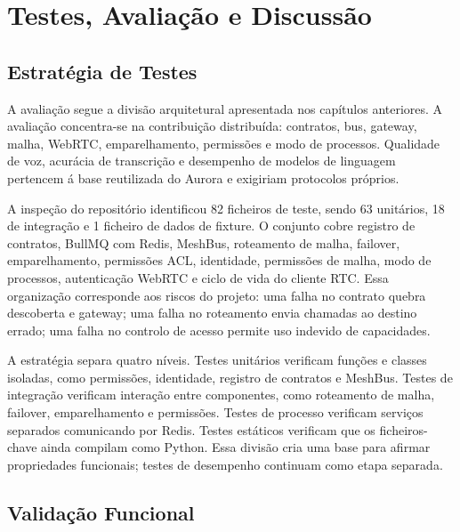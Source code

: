 \chapter{Testes, Avalia\c{c}\~{a}o e Discuss\~{a}o}
\label{chap:testes-avaliacao}

\section{Estrat\'{e}gia de Testes}
\label{sec:estrategia-testes}

A avalia\c{c}\~{a}o segue a divis\~{a}o arquitetural apresentada nos cap\'{i}tulos anteriores. A avalia\c{c}\~{a}o concentra-se na contribui\c{c}\~{a}o distribu\'{i}da: contratos, bus, gateway, malha, WebRTC, emparelhamento, permiss\~{o}es e modo de processos. Qualidade de voz, acur\'{a}cia de transcri\c{c}\~{a}o e desempenho de modelos de linguagem pertencem \'{a} base reutilizada do Aurora e exigiriam protocolos pr\'{o}prios.

A inspe\c{c}\~{a}o do reposit\'{o}rio identificou 82 ficheiros de teste, sendo 63 unit\'{a}rios, 18 de integra\c{c}\~{a}o e 1 ficheiro de dados de fixture. O conjunto cobre registro de contratos, BullMQ com Redis, MeshBus, roteamento de malha, failover, emparelhamento, permiss\~{o}es ACL, identidade, permiss\~{o}es de malha, modo de processos, autentica\c{c}\~{a}o WebRTC e ciclo de vida do cliente RTC. Essa organiza\c{c}\~{a}o corresponde aos riscos do projeto: uma falha no contrato quebra descoberta e gateway; uma falha no roteamento envia chamadas ao destino errado; uma falha no controlo de acesso permite uso indevido de capacidades.

A estrat\'{e}gia separa quatro n\'{i}veis. Testes unit\'{a}rios verificam fun\c{c}\~{o}es e classes isoladas, como permiss\~{o}es, identidade, registro de contratos e MeshBus. Testes de integra\c{c}\~{a}o verificam intera\c{c}\~{a}o entre componentes, como roteamento de malha, failover, emparelhamento e permiss\~{o}es. Testes de processo verificam servi\c{c}os separados comunicando por Redis. Testes est\'{a}ticos verificam que os ficheiros-chave ainda compilam como Python. Essa divis\~{a}o cria uma base para afirmar propriedades funcionais; testes de desempenho continuam como etapa separada.

\section{Valida\c{c}\~{a}o Funcional}
\label{sec:validacao-funcional}


